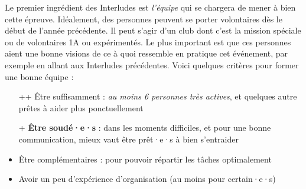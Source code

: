 Le premier ingrédient des Interludes est \emph{l'équipe} qui se chargera de mener à bien cette épreuve. Idéalement, des personnes peuvent se porter volontaires dès le début de l'année précédente. Il peut s'agir d'un club dont c'est la mission spéciale ou de volontaires 1A ou expérimentés. Le plus important est que ces personnes aient une bonne visions de ce à quoi ressemble en pratique cet événement, par exemple en allant aux Interludes précédentes. Voici quelques critères pour former une bonne équipe :
\begin{itemize}
    \item[++] Être suffisamment : \emph{au moins 6 personnes très actives}, et quelques autre prêtes à aider plus ponctuellement
    \item[+] \textbf{Être soudé·e·s} : dans les moments difficiles, et pour une bonne communication, mieux vaut être prêt·e·s à bien s'entraider
    \item Être complémentaires : pour pouvoir répartir les tâches optimalement
    \item Avoir un peu d'expérience d'organisation (au moins pour certain·e·s)
\end{itemize}

